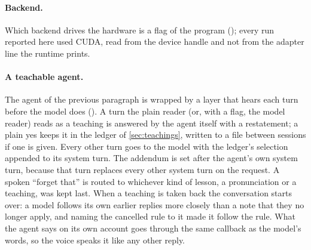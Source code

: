 \paragraph{Backend.}
Which backend drives the hardware is a flag of the program (); every run reported here used CUDA, read from the device handle and not from the adapter line the runtime prints.

\paragraph{A teachable agent.}
The agent of the previous paragraph is wrapped by a layer that hears each turn before the model does (). A turn the plain reader (or, with a flag, the model reader)
reads as a teaching is answered by the agent itself with a restatement; a plain yes keeps it in the ledger of \cref{sec:teachings}, written to a file between sessions if one is given.
Every other turn goes to the model with the ledger's selection appended to its system turn. The addendum is set after the agent's own system turn, because that turn replaces every other system turn on the request. A spoken ``forget that'' is routed to whichever
kind of lesson, a pronunciation or a teaching, was kept last. When a teaching is taken back the conversation starts over: a model follows its own earlier replies more closely than a note that they no longer apply, and naming the cancelled rule to it made it follow the rule. What the agent says on its own account goes through the same callback as the model's words, so the voice speaks it like any other reply.
